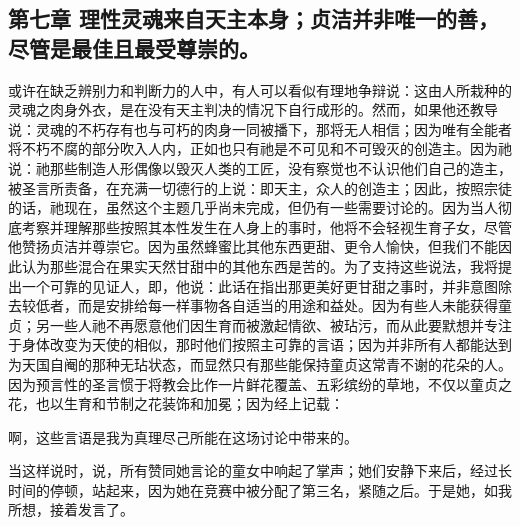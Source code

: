 
\subsection{第七章 理性灵魂来自天主本身；贞洁并非唯一的善，尽管是最佳且最受尊崇的。}

或许在缺乏辨别力和判断力的人中，有人可以看似有理地争辩说：这由人所栽种的灵魂之肉身外衣，是在没有天主判决的情况下自行成形的。然而，如果他还教导说：灵魂的不朽存有也与可朽的肉身一同被播下，那将无人相信；因为唯有全能者将不朽不腐的部分吹入人内，正如也只有祂是不可见和不可毁灭的创造主。因为祂说：祂那些制造人形偶像以毁灭人类的工匠，没有察觉也不认识他们自己的造主，被圣言所责备，在充满一切德行的上说：即天主，众人的创造主；因此，按照宗徒的话，祂现在，虽然这个主题几乎尚未完成，但仍有一些需要讨论的。因为当人彻底考察并理解那些按照其本性发生在人身上的事时，他将不会轻视生育子女，尽管他赞扬贞洁并尊崇它。因为虽然蜂蜜比其他东西更甜、更令人愉快，但我们不能因此认为那些混合在果实天然甘甜中的其他东西是苦的。为了支持这些说法，我将提出一个可靠的见证人，即，他说：此话在指出那更美好更甘甜之事时，并非意图除去较低者，而是安排给每一样事物各自适当的用途和益处。因为有些人未能获得童贞；另一些人祂不再愿意他们因生育而被激起情欲、被玷污，而从此要默想并专注于身体改变为天使的相似，那时他们按照主可靠的言语；因为并非所有人都能达到为天国自阉的那种无玷状态，而显然只有那些能保持童贞这常青不谢的花朵的人。因为预言性的圣言惯于将教会比作一片鲜花覆盖、五彩缤纷的草地，不仅以童贞之花，也以生育和节制之花装饰和加冕；因为经上记载：\par

啊，这些言语是我为真理尽己所能在这场讨论中带来的。\par

当这样说时，说，所有赞同她言论的童女中响起了掌声；她们安静下来后，经过长时间的停顿，站起来，因为她在竞赛中被分配了第三名，紧随之后。于是她，如我所想，接着发言了。\par

